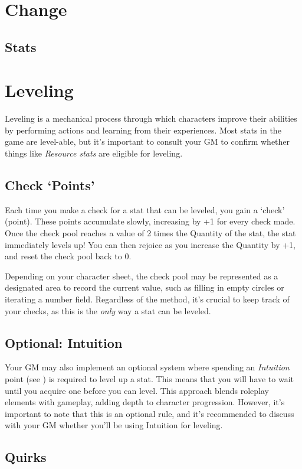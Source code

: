 \documentclass[../main.tex]{subfiles}
\begin{document}
    \section{Change}

    \subsection{Stats}

    \section{Leveling}

    Leveling is a mechanical process through which characters improve their abilities by performing actions and learning from their experiences. Most stats in the game are level-able, but it's important to consult your GM to confirm whether things like \emph{Resource stats} are eligible for leveling.

    \subsection{Check `Points'}

    Each time you make a check for a stat that can be leveled, you gain a `check' (point). These points accumulate slowly, increasing by +1 for every check made. Once the check pool reaches a value of 2 times the Quantity of the stat, the stat immediately levels up! You can then rejoice as you increase the Quantity by +1, and reset the check pool back to 0.

    Depending on your character sheet, the check pool may be represented as a designated area to record the current value, such as filling in empty circles or iterating a number field. Regardless of the method, it's crucial to keep track of your checks, as this is the \emph{only} way a stat can be leveled.

    \subsection{Optional: Intuition}
    
    Your GM may also implement an optional system where spending an \emph{Intuition} point (see {}) is required to level up a stat. This means that you will have to wait until you acquire one before you can level. This approach blends roleplay elements with gameplay, adding depth to character progression. However, it's important to note that this is an optional rule, and it's recommended to discuss with your GM whether you'll be using Intuition for leveling.

    \subsection{Quirks}
\end{document}

